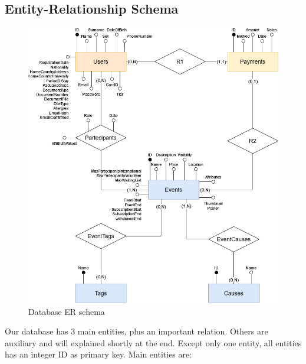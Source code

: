 \subsection{Entity-Relationship Schema}
\begin{figure}[h!]
    \centering
    \includegraphics[width=1\textwidth]{images/ERSchema.png}
    \caption{Database ER schema}
    \label{fig:er_schema}
\end{figure}
Our database has 3 main entities, plus an important relation. Others are auxiliary
and will explained shortly at the end. Except only one entity, all entities has an integer ID
as primary key. Main entities are:
